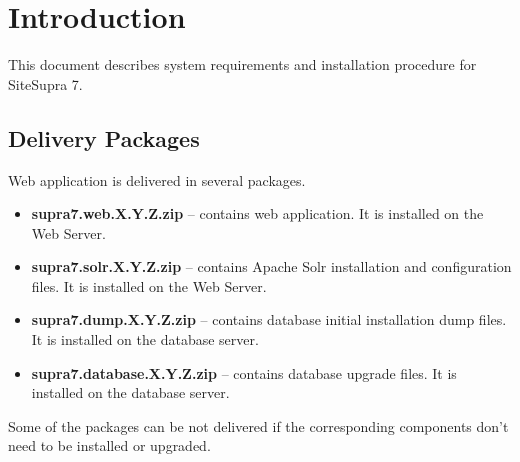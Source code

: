 \documentclass[12pt]{article}
\newcommand{\vigProjectName}{SiteSupra 7}
\newcommand{\vigPackageName}{supra7}
\newcommand{\vigReleaseVersion}{X.Y.Z}
\begin{document}
%
%
%

\newpage

\section{Introduction}

This document describes system requirements and installation procedure for {\vigProjectName}.

\subsection{Delivery Packages}

Web application is delivered in several packages.

\begin{itemize}
	\item \textbf{{\vigPackageName}.web.\vigReleaseVersion.zip} -- contains web application. It is installed on the Web Server.
	\item \textbf{{\vigPackageName}.solr.\vigReleaseVersion.zip} -- contains Apache Solr installation and configuration files. It is installed on the Web Server.
	\item \textbf{{\vigPackageName}.dump.\vigReleaseVersion.zip} -- contains database initial installation dump files. It is installed on the database server.
	\item \textbf{{\vigPackageName}.database.\vigReleaseVersion.zip} -- contains database upgrade files. It is installed on the database server.
\end{itemize}

Some of the packages can be not delivered if the corresponding components don't need to be installed or upgraded.
\end{document}
